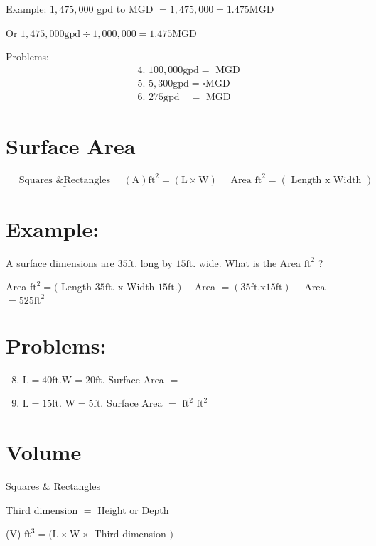 \begin{enumerate}
Example: $1,475,000$ gpd to MGD $=1,475,000=1.475 \mathrm{MGD}$

Or $1,475,000 \mathrm{gpd} \div 1,000,000=1.475 \mathrm{MGD}$

Problems:
$$
\begin{aligned}
& \text { 4. } 100,000 \mathrm{gpd}=\text { MGD } \\
& \text { 5. } 5,300 \mathrm{gpd}=\square \mathrm{MGD} \\
& \text { 6. } 275 \mathrm{gpd} \quad=\text { MGD }
\end{aligned}
$$

\section{Surface Area}
$$
\quad \underline{\text { Squares \& Rectangles }} \quad(\mathrm{A}) \mathrm{ft}^{2}=(\mathrm{L} \times \mathrm{W}) \quad \text { Area } \mathrm{ft}^{2}=(\text { Length } \mathrm{x} \text { Width })
$$

\section{Example:}
A surface dimensions are $35 \mathrm{ft}$. long by $15 \mathrm{ft}$. wide. What is the Area $\mathrm{ft}^{2}$ ?

Area $\mathrm{ft}^{2}=($ Length $35 \mathrm{ft}$. x Width $15 \mathrm{ft} .) \quad$ Area $=(35 \mathrm{ft} . \mathrm{x} 15 \mathrm{ft}) \quad$ Area $=525 \mathrm{ft}^{2}$

\section{Problems:}
\begin{enumerate}
  \setcounter{enumi}{7}
  \item $\mathrm{L}=40 \mathrm{ft} . \mathrm{W}=20 \mathrm{ft}$. Surface Area $=$

  \item $\mathrm{L}=15 \mathrm{ft}$. $\mathrm{W}=5 \mathrm{ft}$. Surface Area $=$ $\mathrm{ft}^{2}$ $\mathrm{ft}^{2}$

\end{enumerate}
\section{Volume}
Squares \& Rectangles

Third dimension $=$ Height or Depth

(V) $\mathrm{ft}^{3}=(\mathrm{L} \times \mathrm{W} \times$ Third dimension $)$


\end{enumerate}

